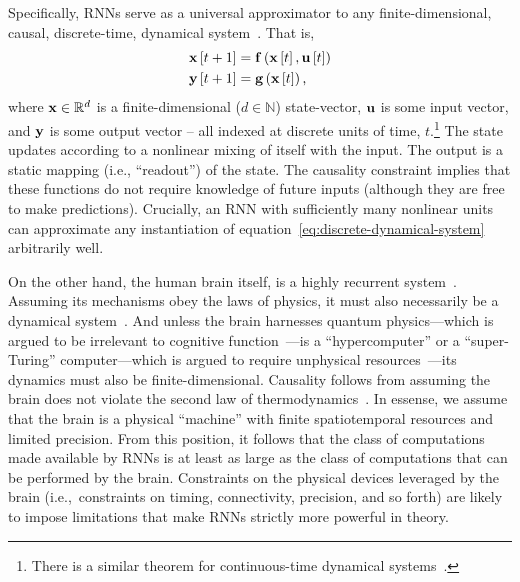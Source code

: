 Specifically, RNNs serve as a universal approximator to any finite-dimensional, causal, discrete-time, dynamical system~\citep{schafer2006recurrent}.
That is,
\begin{equation}
\begin{aligned} \label{eq:discrete-dynamical-system}
\mathbf{x}\left[ t + 1 \right] &= \mathbf{f}\left(\mathbf{x}\left[ t \right], \mathbf{u}\left[ t \right] \right) \\
\mathbf{y}\left[ t + 1 \right] &= \mathbf{g}\left(\mathbf{x}\left[ t \right] \right) \text{,}
\end{aligned}
\end{equation}
where $\mathbf{x} \in \mathbb{R}^d$ is a finite-dimensional ($d \in \mathbb{N}$) state-vector, $\mathbf{u}$ is some input vector, and $\mathbf{y}$ is some output vector -- all indexed at discrete units of time, $t$.\footnote{
There is a similar theorem for continuous-time dynamical systems~\citep{funahashi1993approximation}.
}
The state updates according to a nonlinear mixing of itself with the input.
The output is a static mapping (i.e., ``readout'') of the state.
The causality constraint implies that these functions do not require knowledge of future inputs (although they are free to make predictions).
Crucially, an RNN with sufficiently many nonlinear units can approximate any instantiation of equation~\ref{eq:discrete-dynamical-system} arbitrarily well.

On the other hand, the human brain itself, is a highly recurrent system~\citep{dayan2001theoretical}.
Assuming its mechanisms obey the laws of physics, it must also necessarily be a dynamical system~\citep{amit1989modeling, mckenna1994brain, port1995mind}.
And unless the brain harnesses quantum physics---which is argued to be irrelevant to cognitive function~\citep{litt2006brain}---is a ``hypercomputer'' or a ``super-Turing'' computer---which is argued to require unphysical resources~\citep{broersma2018computability}---its dynamics must also be finite-dimensional.
Causality follows from assuming the brain does not violate the second law of thermodynamics~\citep{evans1996causality}.
In essense, we assume that the brain is a physical ``machine'' with finite spatiotemporal resources and limited precision.
From this position, it follows that the class of computations made available by RNNs is at least as large as the class of computations that can be performed by the brain.
Constraints on the physical devices leveraged by the brain (i.e.,~constraints on timing, connectivity, precision, and so forth) are likely to impose limitations that make RNNs strictly more powerful in theory.

